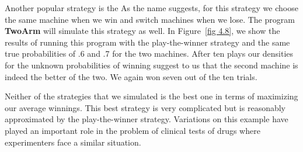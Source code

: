 \begin{example}

Another popular strategy  is the   As the name
suggests, for this strategy we choose the same machine when we win and switch
machines when we lose.  The program {\bf TwoArm} will simulate this
strategy as well.  In Figure~\ref{fig 4.8}, we show the results of running this program
with the play-the-winner strategy and the same true probabilities of .6 and .7
for the two machines.  After ten plays our densities for the unknown
probabilities of winning suggest to us that the second machine is indeed the
better of the two.  We again won seven out of the ten trials.

Neither of the strategies that we simulated is the best one in terms of
maximizing our average winnings.  This best strategy is very complicated but is
reasonably approximated by the play-the-winner strategy.  Variations on this
example have played an important role in the problem of clinical tests of drugs
where experimenters face a similar situation.
\end{example}

